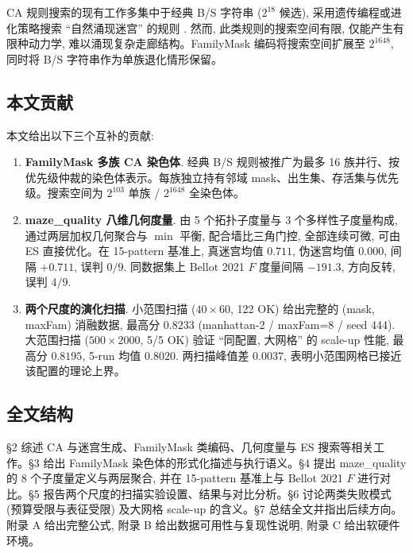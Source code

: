CA 规则搜索的现有工作多集中于经典 B/S 字符串 ($2^{18}$ 候选), 采用遗传编程或进化策略搜索 ``自然涌现迷宫'' 的规则 \cite{rejbrand2017, mcclendon2001}. 然而, 此类规则的搜索空间有限, 仅能产生有限种动力学, 难以涌现复杂走廊结构。FamilyMask 编码将搜索空间扩展至 $2^{1648}$, 同时将 B/S 字符串作为单族退化情形保留。

\subsection{本文贡献}

本文给出以下三个互补的贡献:
\begin{enumerate}[leftmargin=*, itemsep=0pt, topsep=0pt]
  \item \textbf{FamilyMask 多族 CA 染色体}. 经典 B/S 规则被推广为最多 16 族并行、按优先级仲裁的染色体表示。每族独立持有邻域 mask、出生集、存活集与优先级。搜索空间为 $2^{103}$ 单族 / $2^{1648}$ 全染色体。
  \item \textbf{maze\_quality 八维几何度量}. 由 5 个拓扑子度量与 3 个多样性子度量构成, 通过两层加权几何聚合与 $\min$ 平衡, 配合墙比三角门控, 全部连续可微, 可由 ES 直接优化。在 15-pattern 基准上, 真迷宫均值 $0.711$, 伪迷宫均值 $0.000$, 间隔 $+0.711$, 误判 $0/9$. 同数据集上 Bellot 2021 $F$ 度量间隔 $-191.3$, 方向反转, 误判 $4/9$.
  \item \textbf{两个尺度的演化扫描}. 小范围扫描 ($40 \times 60$, 122 OK) 给出完整的 (mask, maxFam) 消融数据, 最高分 $0.8233$ (manhattan-2 / maxFam=8 / seed 444). 大范围扫描 ($500 \times 2000$, 5/5 OK) 验证 ``同配置, 大网格'' 的 scale-up 性能, 最高分 $0.8195$, 5-run 均值 $0.8020$. 两扫描峰值差 $0.0037$, 表明小范围网格已接近该配置的理论上界。
\end{enumerate}

\subsection{全文结构}

§2 综述 CA 与迷宫生成、FamilyMask 类编码、几何度量与 ES 搜索等相关工作。§3 给出 FamilyMask 染色体的形式化描述与执行语义。§4 提出 maze\_quality 的 8 个子度量定义与两层聚合, 并在 15-pattern 基准上与 Bellot 2021 $F$ 进行对比。§5 报告两个尺度的扫描实验设置、结果与对比分析。§6 讨论两类失败模式 (预算受限与表征受限) 及大网格 scale-up 的含义。§7 总结全文并指出后续方向。附录 A 给出完整公式, 附录 B 给出数据可用性与复现性说明, 附录 C 给出软硬件环境。

